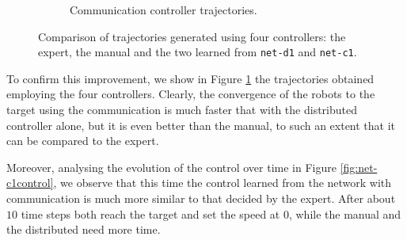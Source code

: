 \begin{figure}[H]
\begin{center}
\begin{subfigure}[h]{0.49\textwidth}
			\caption{Communication controller trajectories.}
		\end{subfigure}
	\end{center}
	\vspace{-0.5cm}
	\caption[Evaluation of the trajectories learned by \texttt{net-c1}.]{Comparison 
	of trajectories generated using four controllers: the expert, the manual and the 
	two learned from \texttt{net-d1} and \texttt{net-c1}.}
	\label{fig:net-c1traj}
\end{figure}

To confirm this improvement, we show in Figure \ref{fig:net-c1traj} the 
trajectories obtained employing the four controllers. 
Clearly, the convergence of the robots to the target using the communication is 
much faster that with the distributed controller alone, but it is even better than 
the manual, to such an extent that it can be compared to the expert.

Moreover, analysing the evolution of the control over time in Figure 
\ref{fig:net-c1control}, we observe that this time the control learned from the 
network with communication is much more similar to that decided by the expert.
After about $10$ time steps both reach the target and set the speed at $0$, while 
the manual and the distributed need more time.



